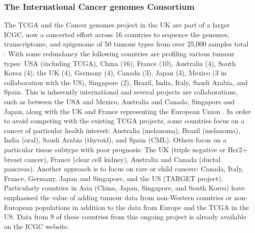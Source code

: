 \subsubsection{The International Cancer \Glspl{genome} Consortium}
The \gls{TCGA} and the Cancer \Glspl{genome} project in the UK are part of a larger \gls{ICGC}, now a concerted effort across 16 countries to sequence the \glspl{genome}, \gls{transcriptome}, and epigenome of 50 \gls{tumour} types from over 25,000 samples total \citep{ICGC2011}. With some redundancy the following countries are profiling various tumour types: USA (including \gls{TCGA}), China (16), France (10), Australia (4), South Korea (4), the UK (4), Germany (4), Canada (3), Japan (3), Mexico (3 in collaboration with the US), Singapore (2),  Brazil, India, Italy, Saudi Arabia, and Spain. This is inherently international and several projects are collaborations, such as between the USA and Mexico, Australia and Canada, Singapore and Japan, along with the UK and France representing the European Union \citep{ICGC2017web}. In order to avoid competing with the existing \gls{TCGA} projects, some countries focus on a cancer of particular health interest: Australia (melanoma), Brazil (melanoma), India (oral), Saudi Arabia (thyroid), and Spain (CML). Others focus on a particular tissue subtype with poor prognosis: The UK (triple negative or Her2$+$ breast cancer), France (clear cell kidney), Australia and Canada (ductal pancreas). Another approach is to focus on rare or child cancers: Canada, Italy, France, Germany, Japan and Singapore, and the US (TARGET project). Particularly countries in Asia (China, Japan, Singapore, and South Korea) have emphasised the value of adding tumour data from non-Western countries or non-European populations in addition to the data from Europe and the \gls{TCGA} in the US. Data from 9 of these countries from this ongoing project is already available on the \gls{ICGC} website.
\fi


